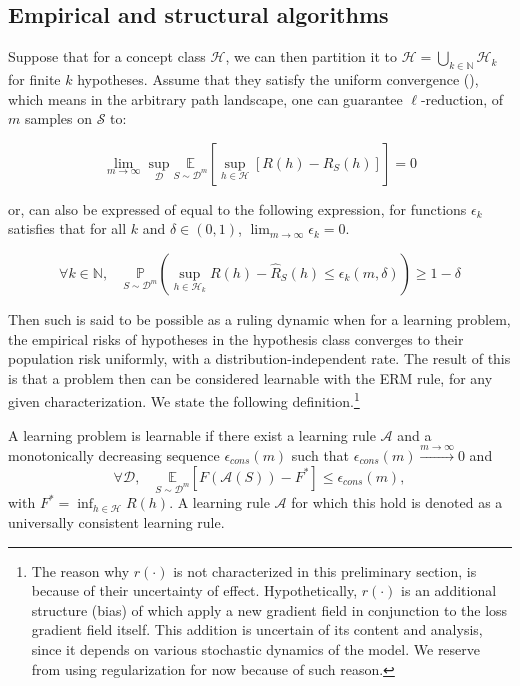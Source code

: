 \subsection{Empirical and structural algorithms}

Suppose that for a concept class $\mathcal{H}$, we can then partition it to $\mathcal{H}=\bigcup_{k\in \mathbb{N}} \mathcal{H}_{k}$ for finite $k$ hypotheses. Assume that they satisfy the uniform convergence (\cite{JMLR:v11:shalev-shwartz10a}), which means in the arbitrary path landscape, one can guarantee $\ell$-reduction, of $m$ samples on $\mathcal{S}$ to:

\begin{equation}
    \lim_{m\to \infty} \sup_{\mathcal{D}} \underset{S\sim\mathcal{D}^{m}}{\mathbb{E}} \left[ \sup_{h\in\mathcal{H}} [R(h) - R_{S}(h)] \right] = 0
\end{equation}

or, can also be expressed of equal to the following expression, for functions $\epsilon_{k}$ satisfies that for all $k$ and $\delta\in (0,1)$, $\lim_{m\to\infty}\epsilon_{k}=0$.

\begin{equation}
    \forall k \in \mathbb{N}, \quad \underset{S\sim \mathcal{D}^{m}}{\mathbb{P}} \left(\sup_{h\in \mathcal{H}_{k}} R(h) - \hat{R}_{S}(h)\leq \epsilon_{k}(m,\delta)\right) \geq 1- \delta
\end{equation}

Then such is said to be possible as a ruling dynamic when for a learning problem, the empirical risks of hypotheses in the hypothesis class converges to their population risk uniformly, with a distribution-independent rate. The result of this is that a problem then can be considered learnable with the ERM rule, for any given characterization. We state the following definition.\footnote{The reason why $r(\cdot)$ is not characterized in this preliminary section, is because of their uncertainty of effect. Hypothetically, $r(\cdot)$ is an additional structure (bias) of which apply a new gradient field in conjunction to the loss gradient field itself. This addition is uncertain of its content and analysis, since it depends on various stochastic dynamics of the model. We reserve from using regularization for now because of such reason.}

\begin{definition}
    A learning problem is learnable if there exist a learning rule $\mathcal{A}$ and a monotonically decreasing sequence $\epsilon_{cons}(m)$ such that $\epsilon_{cons}(m)\overset{m\to\infty}{\longrightarrow} 0$ and \begin{equation}
        \forall \mathcal{D} , \quad \underset{S\sim\mathcal{D}^{m}}{\mathbb{E}} \left[F(\mathcal{A}(S))-F^{*}\right] \leq \epsilon_{cons}(m),
    \end{equation}
    with $F^{*} = \inf_{h\in\mathcal{H}} R(h)$. A learning rule $\mathcal{A}$ for which this hold is denoted as a universally consistent learning rule. 
\end{definition}

